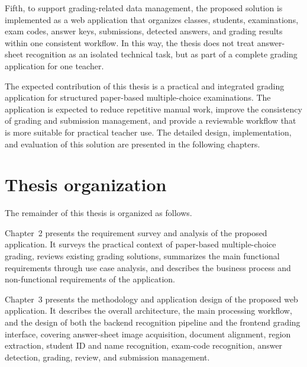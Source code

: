 \documentclass[../Main.tex]{subfiles}
\begin{document}
Fifth, to support grading-related data management, the proposed solution is
implemented as a web application that organizes classes, students,
examinations, exam codes, answer keys, submissions, detected answers, and
grading results within one consistent workflow. In this way, the thesis does not
treat answer-sheet recognition as an isolated technical task, but as part of a
complete grading application for one teacher.

The expected contribution of this thesis is a practical and integrated grading
application for structured paper-based multiple-choice examinations. The
application is expected to reduce repetitive manual work, improve the
consistency of grading and submission management, and provide a reviewable
workflow that is more suitable for practical teacher use. The detailed design,
implementation, and evaluation of this solution are presented in the following
chapters.

\section{Thesis organization}
\label{section:1.4}
The remainder of this thesis is organized as follows.

Chapter~2 presents the requirement survey and analysis of the proposed
application. It surveys the practical context of paper-based multiple-choice
grading, reviews existing grading solutions, summarizes the main functional
requirements through use case analysis, and describes the business process and
non-functional requirements of the application.

Chapter~3 presents the methodology and application design of the proposed web
application. It describes the overall architecture, the main processing workflow,
and the design of both the backend recognition pipeline and the frontend grading
interface, covering answer-sheet image acquisition, document alignment, region
extraction, student ID and name recognition, exam-code recognition, answer
detection, grading, review, and submission management.
\end{document}
